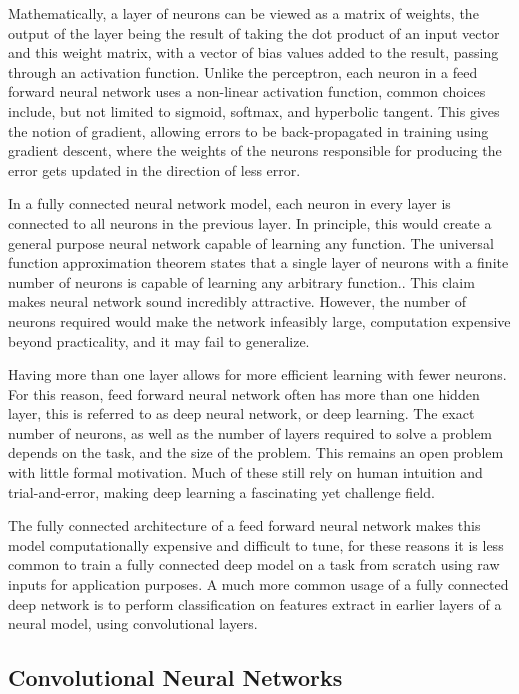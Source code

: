 Mathematically, a layer of neurons can be viewed as a matrix of weights, the output of the layer being the result of taking the dot product of an input vector and this weight matrix, with a vector of bias values added to the result, passing through an activation function. Unlike the perceptron, each neuron in a feed forward neural network uses a non-linear activation function, common choices include, but not limited to sigmoid, softmax, and hyperbolic tangent. This gives the notion of gradient, allowing errors to be back-propagated in training using gradient descent, where the weights of the neurons responsible for producing the error gets updated in the direction of less error.



In a fully connected neural network model, each neuron in every layer is connected to all neurons in the previous layer. In principle, this would create a general purpose neural network capable of learning any function. The universal function approximation theorem states that a single layer of neurons with a finite number of neurons is capable of learning any arbitrary function.\cite{cybenko1989approximation}. This claim makes neural network sound incredibly attractive. However, the number of neurons required would make the network infeasibly large, computation expensive beyond practicality, and it may fail to generalize. 

Having more than one layer allows for more efficient learning with fewer neurons. For this reason, feed forward neural network often has more than one hidden layer, this is referred to as deep neural network, or deep learning.  The exact number of neurons, as well as the number of layers required to solve a problem depends on the task, and the size of the problem. This remains an open problem with little formal motivation. Much of these still rely on human intuition and trial-and-error, making deep learning a fascinating yet challenge field.

The fully connected architecture of a feed forward neural network makes this model computationally expensive and difficult to tune, for these reasons it is less common to train a fully connected deep model on a task from scratch using raw inputs for application purposes. A much more common usage of a fully connected deep network is to perform classification on features extract in earlier layers of a neural model, using convolutional layers.


\subsection{Convolutional Neural Networks}

